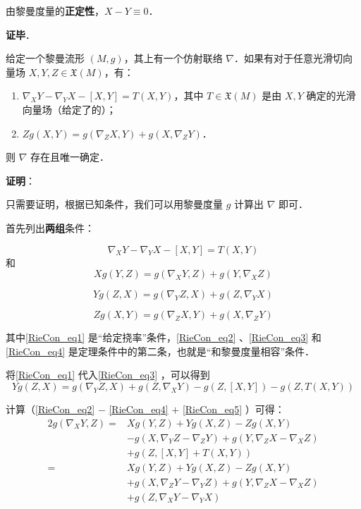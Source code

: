 由黎曼度量的\textbf{正定性}，$X-Y\equiv 0$．

\textbf{证毕}．






\begin{theorem}{}\label{RieCon_the1}
给定一个黎曼流形 $(M, g)$，其上有一个仿射联络 $\nabla$．如果有对于任意光滑切向量场 $X, Y, Z\in\mathfrak{X}(M)$，有：
\begin{enumerate}
\item $\nabla_XY-\nabla_YX-[X, Y]=T(X, Y)$，其中 $T\in \mathfrak{X}(M)$ 是由 $X, Y$ 确定的光滑向量场（给定了的）；
\item $Zg(X, Y)=g(\nabla_ZX, Y)+g(X, \nabla_ZY)$．
\end{enumerate}
则 $\nabla$ 存在且唯一确定．
\end{theorem}

\textbf{证明}：

只需要证明，根据已知条件，我们可以用黎曼度量 $g$ 计算出 $\nabla$ 即可．

首先列出\textbf{两组}条件：

\begin{equation}\label{RieCon_eq1}
\nabla_XY-\nabla_YX-[X, Y]=T(X, Y)
\end{equation}
和
\begin{equation}\label{RieCon_eq2}
Xg(Y, Z)=g(\nabla_XY, Z)+g(Y, \nabla_XZ)
\end{equation}

\begin{equation}\label{RieCon_eq3}
Yg(Z, X)=g(\nabla_YZ, X)+g(Z, \nabla_YX)
\end{equation}

\begin{equation}\label{RieCon_eq4}
Zg(X, Y)=g(\nabla_ZX, Y)+g(X, \nabla_ZY)
\end{equation}


其中\autoref{RieCon_eq1} 是“给定挠率”条件，\autoref{RieCon_eq2} 、\autoref{RieCon_eq3} 和\autoref{RieCon_eq4} 是定理条件中的第二条，也就是“和黎曼度量相容”条件．

将\autoref{RieCon_eq1} 代入\autoref{RieCon_eq3} ，可以得到
\begin{equation}\label{RieCon_eq5}
Yg(Z, X)=g(\nabla_YZ, X)+g(Z, \nabla_XY)-g(Z, [X, Y])-g(Z, T(X, Y))
\end{equation}

计算（\autoref{RieCon_eq2} $-$ \autoref{RieCon_eq4} $+$ \autoref{RieCon_eq5} ）可得：
\begin{equation}\label{RieCon_eq6}
\begin{aligned}
2g(\nabla_XY, Z)=&Xg(Y, Z)+Yg(X, Z)-Zg(X, Y)\\&-g(X, \nabla_YZ-\nabla_ZY)+g(Y, \nabla_ZX-\nabla_XZ)\\&+g(Z, [X, Y]+T(X, Y))\\
=&Xg(Y, Z)+Yg(X, Z)-Zg(X, Y)\\&+g(X, \nabla_ZY-\nabla_YZ)+g(Y, \nabla_ZX-\nabla_XZ)\\&+g(Z, \nabla_XY-\nabla_YX)
\end{aligned}
\end{equation}

